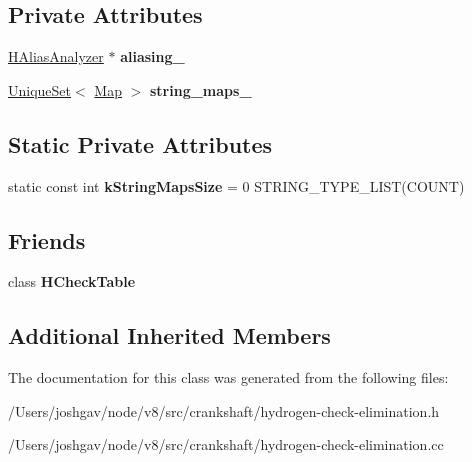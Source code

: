 \subsection*{Private Attributes}
\begin{DoxyCompactItemize}
\item 
\hyperlink{classv8_1_1internal_1_1_h_alias_analyzer}{H\+Alias\+Analyzer} $\ast$ {\bfseries aliasing\+\_\+}\hypertarget{classv8_1_1internal_1_1_h_check_elimination_phase_a43dd03c4b8a9d185a1a94a560a2a55a8}{}\label{classv8_1_1internal_1_1_h_check_elimination_phase_a43dd03c4b8a9d185a1a94a560a2a55a8}

\item 
\hyperlink{classv8_1_1internal_1_1_unique_set}{Unique\+Set}$<$ \hyperlink{classv8_1_1internal_1_1_map}{Map} $>$ {\bfseries string\+\_\+maps\+\_\+}\hypertarget{classv8_1_1internal_1_1_h_check_elimination_phase_a2f2217fe921241207b7e3e87bcfb7531}{}\label{classv8_1_1internal_1_1_h_check_elimination_phase_a2f2217fe921241207b7e3e87bcfb7531}

\end{DoxyCompactItemize}
\subsection*{Static Private Attributes}
\begin{DoxyCompactItemize}
\item 
static const int {\bfseries k\+String\+Maps\+Size} = 0 S\+T\+R\+I\+N\+G\+\_\+\+T\+Y\+P\+E\+\_\+\+L\+I\+ST(C\+O\+U\+NT)\hypertarget{classv8_1_1internal_1_1_h_check_elimination_phase_a87feffcfc944876c3b273ed9f2780d12}{}\label{classv8_1_1internal_1_1_h_check_elimination_phase_a87feffcfc944876c3b273ed9f2780d12}

\end{DoxyCompactItemize}
\subsection*{Friends}
\begin{DoxyCompactItemize}
\item 
class {\bfseries H\+Check\+Table}\hypertarget{classv8_1_1internal_1_1_h_check_elimination_phase_ad1c00a02f5af9d4d62a6dbdc073b9402}{}\label{classv8_1_1internal_1_1_h_check_elimination_phase_ad1c00a02f5af9d4d62a6dbdc073b9402}

\end{DoxyCompactItemize}
\subsection*{Additional Inherited Members}


The documentation for this class was generated from the following files\+:\begin{DoxyCompactItemize}
\item 
/\+Users/joshgav/node/v8/src/crankshaft/hydrogen-\/check-\/elimination.\+h\item 
/\+Users/joshgav/node/v8/src/crankshaft/hydrogen-\/check-\/elimination.\+cc\end{DoxyCompactItemize}
